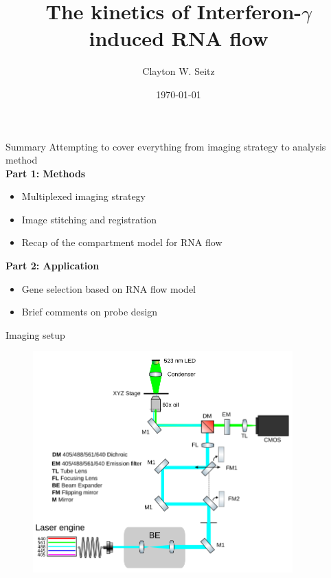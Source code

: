 \documentclass[aspectratio=1610]{beamer}					%
\title{The kinetics of Interferon-$\gamma$ induced RNA flow}	%
\author{Clayton W. Seitz}								%
\date{\today}									%
\begin{document}
\begin{frame}
  \titlepage
\end{frame}


%

\begin{frame}{Summary}
Attempting to cover everything from imaging strategy to analysis method\\
\vspace{0.2in}
\textbf{Part 1: Methods}
\begin{itemize}
\item Multiplexed imaging strategy
\item Image stitching and registration
\item Recap of the compartment model for RNA flow
\end{itemize}
\textbf{Part 2: Application}
\begin{itemize}
\item Gene selection based on RNA flow model
\item Brief comments on probe design
\end{itemize}
\end{frame}

\begin{frame}{Imaging setup}
\begin{figure}
\includegraphics[width=10cm]{hilo-epi.png}
\end{figure}
\end{frame}
\end{document}
